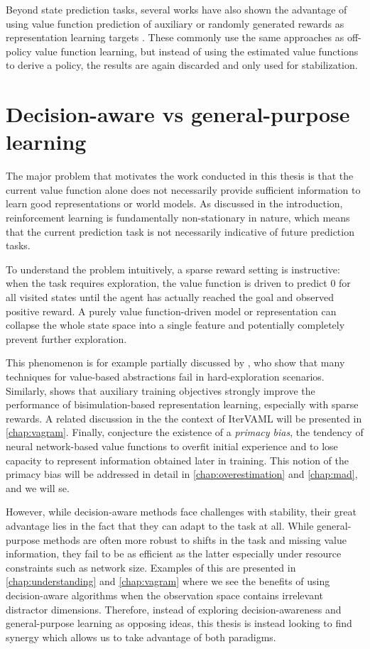 Beyond state prediction tasks, several works have also shown the advantage of using value function prediction of auxiliary or randomly generated rewards as representation learning targets \parencite{lyle2021effect,farebrother2023protovalue}.
These commonly use the same approaches as off-policy value function learning, but instead of using the estimated value functions to derive a policy, the results are again discarded and only used for stabilization.

\section{Decision-aware vs general-purpose learning}

The major problem that motivates the work conducted in this thesis is that the current value function alone does not necessarily provide sufficient information to learn good representations or world models.
As discussed in the introduction, reinforcement learning is fundamentally non-stationary in nature, which means that the current prediction task is not necessarily indicative of future prediction tasks.

To understand the problem intuitively, a sparse reward setting is instructive: when the task requires exploration, the value function is driven to predict $0$ for all visited states until the agent has actually reached the goal and observed positive reward.
A purely value function-driven model or representation can collapse the whole state space into a single feature and potentially completely prevent further exploration.

This phenomenon is for example partially discussed by \textcite{tomar2023learning}, who show that many techniques for value-based abstractions fail in hard-exploration scenarios.
Similarly, \textcite{kemertas2021towards} shows that auxiliary training objectives strongly improve the performance of bisimulation-based representation learning, especially with sparse rewards.
A related discussion in the the context of IterVAML will be presented in \autoref{chap:vagram}.
Finally, \textcite{nikishin2022primacy} conjecture the existence of a \emph{primacy bias}, the tendency of neural network-based value functions to overfit initial experience and to lose capacity to represent information obtained later in training.
This notion of the primacy bias will be addressed in detail in \autoref{chap:overestimation} and \autoref{chap:mad}, and we will se.

However, while decision-aware methods face challenges with stability, their great advantage lies in the fact that they can adapt to the task at all.
While general-purpose methods are often more robust to shifts in the task and missing value information, they fail to be as efficient as the latter especially under resource constraints such as network size.
Examples of this are presented in \autoref{chap:understanding} and \autoref{chap:vagram} where we see the benefits of using decision-aware algorithms when the observation space contains irrelevant distractor dimensions.
Therefore, instead of exploring decision-awareness and general-purpose learning as opposing ideas, this thesis is instead looking to find synergy which allows us to take advantage of both paradigms.